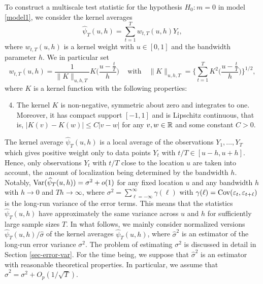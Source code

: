 \documentclass[a4paper,12pt]{article}
\numberwithin{equation}{section}
\begin{document}
To construct a multiscale test statistic for the hypothesis $H_0: m = 0$ in model \eqref{model1}, we consider the kernel averages
\begin{equation*}
\widehat{\psi}_T(u,h) = \sum\limits_{t=1}^T w_{t,T}(u,h) Y_t, 
\end{equation*}
where $w_{t,T}(u,h)$ is a kernel weight with $u \in [0,1]$ and the bandwidth parameter $h$. We in particular set 
\begin{equation}\label{weights}
w_{t,T}(u,h) = \frac{1}{\|K\|_{u,h,T}} K\Big( \frac{u - \frac{t}{T}}{h} \Big) \, \quad \text{with} \quad \|K\|_{u,h,T} = \Big\{\sum\limits_{t=1}^T  K^2\Big( \frac{u - \frac{t}{T}}{h} \Big)\Big\}^{1/2}, 
\end{equation}
where $K$ is a kernel function with the following properties: 
\begin{enumerate}[label=(C\arabic*),leftmargin=1.05cm]
\setcounter{enumi}{3}
\item \label{C-ker} The kernel $K$ is non-negative, symmetric about zero and integrates to one. Moreover, it has compact support $[-1,1]$ and is Lipschitz continuous, that is, $|K(v) - K(w)| \le C |v-w|$ for any $v,w \in \mathbb{R}$ and some constant $C > 0$. 
\end{enumerate} 
The kernel average $\widehat{\psi}_T(u,h)$ is a local average of the observations $Y_1,\ldots,Y_T$ which gives positive weight only to data points $Y_t$ with $t/T \in [u-h,u+h]$. Hence, only observations $Y_t$ with $t/T$ close to the location $u$ are taken into account, the amount of localization being determined by the bandwidth $h$. Notably, $\textnormal{Var}(\widehat{\psi}_T(u,h)) = \sigma^2 + o(1)$ for any fixed location $u$ and any bandwidth $h$ with $h \rightarrow 0$ and $Th \rightarrow \infty$, where $\sigma^2 = \sum\nolimits_{\ell=-\infty}^{\infty} \gamma(\ell)$ with $\gamma(\ell) = \textnormal{Cov}(\varepsilon_t, \varepsilon_{t+\ell})$ is the long-run variance of the error terms. This means that the statistics $\widehat{\psi}_T(u,h)$ have approximately the same variance across $u$ and $h$ for sufficiently large sample sizes $T$. In what follows, we mainly consider normalized versions $\widehat{\psi}_T(u,h)/\widehat{\sigma}$ of the kernel averages $\widehat{\psi}_T(u,h)$, where $\widehat{\sigma}^2$ is an estimator of the long-run error variance $\sigma^2$. The problem of estimating $\sigma^2$ is discussed in detail in Section \ref{sec-error-var}. For the time being, we suppose that $\widehat{\sigma}^2$ is an estimator with reasonable theoretical properties. In particular, we assume that $\widehat{\sigma}^2 = \sigma^2 + O_p(1/\sqrt{T})$. 
\end{document}
